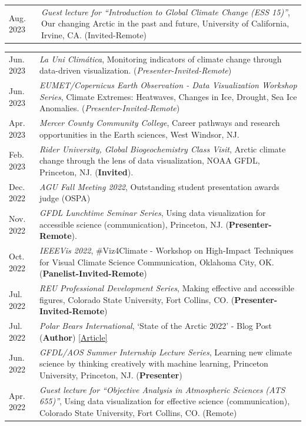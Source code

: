 \documentclass[margin,line,palatino,courier,10pt]{res}
\begin{document}
\begin{resume}
\begin{tabular}{@{}p{0.9in}p{4in}}
Aug. 2023 & \textit{Guest lecture for ``Introduction to Global Climate Change (ESS 15)''}, Our changing Arctic in the past and future, University of California, Irvine, CA. (Invited-Remote)\\
\end{tabular}
\begin{tabular}{@{}p{0.9in}p{4in}}
Jun. 2023 & \textit{La Uni Clim\'{a}tica}, Monitoring indicators of climate change through data-driven visualization. (\textit{Presenter-Invited-Remote})\\
Jun. 2023 & \textit{EUMET/Copernicus Earth Observation - Data Visualization Workshop Series}, Climate Extremes: Heatwaves, Changes in Ice, Drought, Sea Ice Anomalies. (\textit{Presenter-Invited-Remote})\\
Apr. 2023 & \textit{Mercer County Community College}, Career pathways and research opportunities in the Earth sciences, West Windsor, NJ.\\
Feb. 2023 & \textit{Rider University, Global Biogeochemistry Class Visit}, Arctic climate change through the lens of data visualization, NOAA GFDL, Princeton, NJ. (\textbf{Invited}).\\
Dec. 2022 & \textit{AGU Fall Meeting 2022}, Outstanding student presentation awards judge (OSPA)\\
Nov. 2022 & \textit{GFDL Lunchtime Seminar Series}, Using data visualization for accessible science (communication), Princeton, NJ. (\textbf{Presenter-Remote}).\\
Oct. 2022 & \textit{IEEEVis 2022}, \#Viz4Climate - Workshop on High-Impact Techniques for Visual Climate Science Communication, Oklahoma City, OK. (\textbf{Panelist-Invited-Remote})\\
Jul. 2022 & \textit{REU Professional Development Series}, Making effective and accessible figures, Colorado State University, Fort Collins, CO. (\textbf{Presenter-Invited-Remote})\\
Jul. 2022 & \textit{Polar Bears International}, `State of the Arctic 2022' - Blog Post (\textbf{Author}) \href{https://polarbearsinternational.org/news-media/articles/arctic-sea-ice-conditions-2022}{[Article]}\\
Jun. 2022 & \textit{GFDL/AOS Summer Internship Lecture Series}, Learning new climate science by thinking creatively with machine learning, Princeton University, Princeton, NJ. (\textbf{Presenter})\\
Apr. 2022 & \textit{Guest lecture for ``Objective Analysis in Atmospheric Sciences (ATS 655)''}, Using data visualization for effective science (communication), Colorado State University, Fort Collins, CO. (Remote)\\

\end{tabular}
\end{resume}
\end{document}
